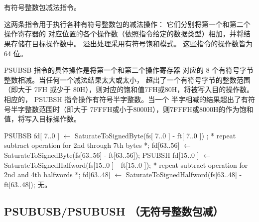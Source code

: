 \begin{instructionblk}
   \\
   \\
  {有符号整数包减法指令。}
  {这两条指令用于执行各种有符号整数包的减法操作： 它们分别将第一个和第二个操作寄存器的
  对应位置的各个操作数（依照指令给定的数据类型）相加，并将结果存储在目标操作数中。
  溢出处理采用有符号饱和模式。 这些指令的操作数皆为 64 位。

  PSUBSB 指令的具体操作是将第一个和第二个操作寄存器
  对应的 8 个有符号字节整数相减。当任何一个减法结果太大或太小，
  超出了一个有符号字节的整数范围（即大于 7FH 或少于
  80H），则对应的饱和值7FH或80H，将被写入目的操作数。
  相应的， PSUBSH 指令操作有符号半字整数。当一个
  半字相减的结果超出了有符号半字整数范围时（即大于
  7FFFH或小于8000H），则7FFFH或8000H的作为饱和值，将写入目标操作数。}
  {PSUBSB \narrownewline
  fd[ 7..0 ]  $\leftarrow$ SaturateToSignedByte(fs[ 7..0 ] - ft[ 7..0 ]) ; \narrownewline
  * repeat subtract operation for 2nd through 7th bytes *; \narrownewline
  fd[63..56] $\leftarrow$ SaturateToSignedByte(fs[63..56] - ft[63..56]); \narrownewline \narrownewline
  PSUBSH \narrownewline
  fd[15..0 ] $\leftarrow$ SaturateToSignedHalfword(fs[15..0 ] - ft[15..0 ]); \narrownewline
  * repeat subtract operation for 2nd and 4th halfwords *; \narrownewline
  fd[63..48] $\leftarrow$ SaturateToSignedHalfword(fs[63..48] - ft[63..48]);}
  {无。}
\end{instructionblk}

\subsection{PSUBUSB/PSUBUSH （无符号整数包减）}


